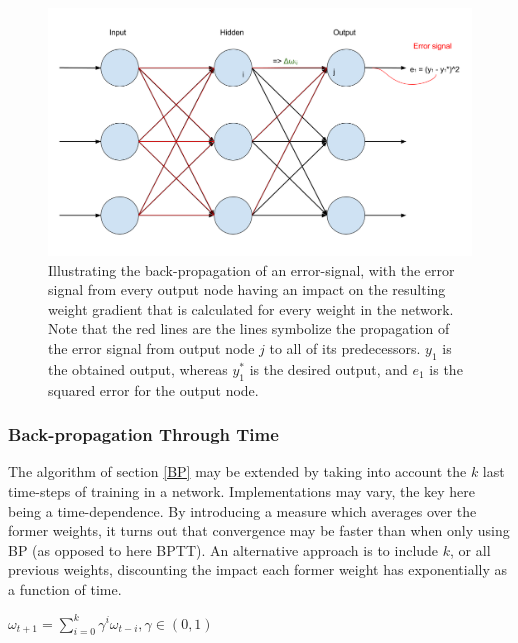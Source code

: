 \begin{figure}
\centering
\includegraphics[width=13cm]{fig/BP_error}
\caption{Illustrating the back-propagation of an error-signal, with the error signal from every output node having an impact on the resulting weight gradient that is calculated for every weight in the network. Note that the red lines are the lines symbolize the propagation of the error signal from output node $j$ to all of its predecessors. $y_1$ is the obtained output, whereas $y_1^*$ is the desired output, and $e_1$ is the squared error for the output node.}
\label{fig:BP_error}
\end{figure}

\subsubsection{Back-propagation Through Time}

The algorithm of section \ref{BP} may be extended by taking into account the $k$ last time-steps of training in a network. Implementations may vary, the key here being a time-dependence. By introducing a measure which averages over the former weights, it turns out that convergence may be faster than when only using BP (as opposed to here BPTT). An alternative approach is to include $k$, or all previous weights, discounting the impact each former weight has exponentially as a function of time.

\begin{center}
\begin{math}
    \omega_{t+1} = \sum_{i=0}^{k}\gamma^i \omega_{t-i},
    \gamma \in (0, 1)
\end{math}
\end{center}


